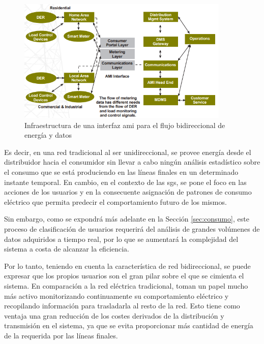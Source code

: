 \vspace{3mm}

\begin{figure}[h!]
  \centering
  \includegraphics[width=0.9\textwidth]{img/teoria/bidir.png}
  \caption{Infraestructura de una interfaz \gls{ami} para el flujo bidireccional de energía y datos \cite{us}}
  \label{fig:bidireccional2}
\end{figure}

Es decir, en una red tradicional al ser unidireccional, se provee energía desde el distribuidor hacia el consumidor sin llevar a cabo ningún análisis estadístico sobre el consumo que se está produciendo en las líneas finales en un determinado instante temporal. En cambio, en el contexto de las \gls{sg}s, se pone el foco en las acciones de los usuarios y en la consecuente asignación de patrones de consumo eléctrico que permita predecir el comportamiento futuro de los mismos. \cite{convencional}

\vspace{3mm}

Sin embargo, como se expondrá más adelante en la Sección \ref{sec:consumo}, este proceso de clasificación de usuarios requerirá del análisis de grandes volúmenes de datos adquiridos a tiempo real, por lo que se aumentará la complejidad del sistema a costa de alcanzar la eficiencia.

\vspace{3mm}

Por lo tanto, teniendo en cuenta la característica de red bidireccional, se puede expresar que los propios usuarios son el gran pilar sobre el que se cimienta el sistema. En comparación a la red eléctrica tradicional, toman un papel mucho más activo monitorizando continuamente su comportamiento eléctrico y recopilando información para trasladarla al resto de la red. Esto tiene como ventaja una gran reducción de los costes derivados de la distribución y transmisión en el sistema, ya que se evita proporcionar más cantidad de energía de la requerida por las líneas finales. \cite{iotfutura}

